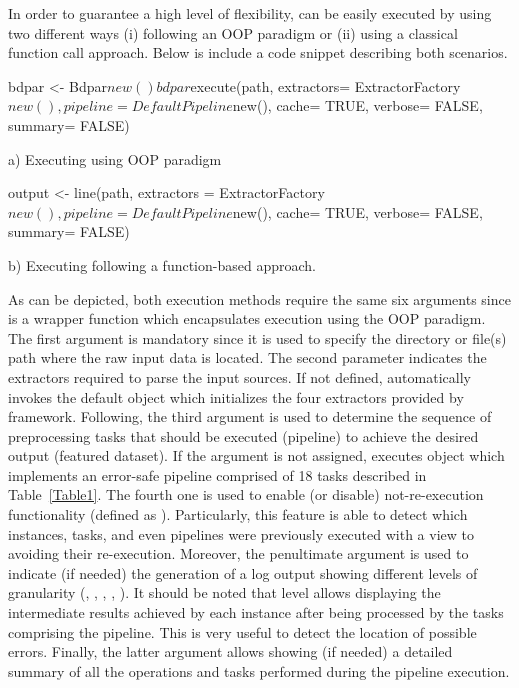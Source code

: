 In order to guarantee a high level of flexibility,  can be easily executed by using two different ways (i) following an OOP paradigm or (ii) using a classical function call approach. Below is include a code snippet describing both scenarios.

\begin{example}
bdpar <- Bdpar$new()
bdpar$execute(path, extractors= ExtractorFactory$new(),
              pipeline= DefaultPipeline$new(), cache= TRUE, 
              verbose= FALSE, summary= FALSE)
\end{example}
a) Executing  using OOP paradigm

\begin{example}
output <- line(path, extractors = ExtractorFactory$new(), 
               pipeline= DefaultPipeline$new(), cache= TRUE, 
               verbose= FALSE, summary= FALSE)
\end{example}
b) Executing  following a function-based approach. 

As can be depicted, both execution methods require the same six arguments since  is a wrapper function which encapsulates  execution using the OOP paradigm. The first argument is mandatory since it is used to specify the directory or file(s) path where the raw input data is located. The second parameter indicates the extractors required to parse the input sources. If not defined,  automatically invokes the default  object which initializes the four extractors provided by  framework. Following, the third argument is used to determine the sequence of preprocessing tasks that should be executed (pipeline) to achieve the desired output (featured dataset). If the argument is not assigned,  executes  object which implements an error-safe pipeline comprised of 18 tasks described in Table~\ref{Table1}. The fourth one is used to enable (or disable)  not-re-execution functionality (defined as ). Particularly, this feature is able to detect which instances, tasks, and even pipelines were previously executed with a view to avoiding their re-execution. Moreover, the penultimate argument is used to indicate (if needed) the generation of a log output showing different levels of granularity (, , , , ). It should be noted that  level allows displaying the intermediate results achieved by each instance after being processed by the tasks comprising the pipeline. This is very useful to detect the location of possible errors. Finally, the latter argument allows showing (if needed) a detailed summary of all the operations and tasks performed during the pipeline execution.

